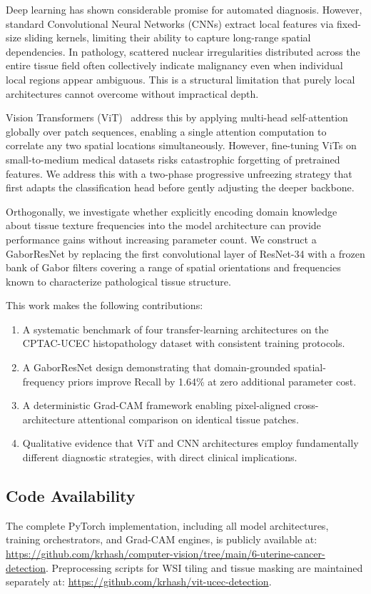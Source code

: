\documentclass[conference]{IEEEtran}
\begin{document}
Deep learning has shown considerable promise for automated diagnosis. However, standard Convolutional Neural Networks (CNNs) extract local features via fixed-size sliding kernels, limiting their ability to capture long-range spatial dependencies. In pathology, scattered nuclear irregularities distributed across the entire tissue field often collectively indicate malignancy even when individual local regions appear ambiguous. This is a structural limitation that purely local architectures cannot overcome without impractical depth.

Vision Transformers (ViT)~\cite{b6} address this by applying multi-head self-attention globally over patch sequences, enabling a single attention computation to correlate any two spatial locations simultaneously. However, fine-tuning ViTs on small-to-medium medical datasets risks catastrophic forgetting of pretrained features. We address this with a two-phase progressive unfreezing strategy that first adapts the classification head before gently adjusting the deeper backbone.

Orthogonally, we investigate whether explicitly encoding domain knowledge about tissue texture frequencies into the model architecture can provide performance gains without increasing parameter count. We construct a GaborResNet by replacing the first convolutional layer of ResNet-34 with a frozen bank of Gabor filters covering a range of spatial orientations and frequencies known to characterize pathological tissue structure.

This work makes the following contributions:
\begin{enumerate}
    \item A systematic benchmark of four transfer-learning architectures on the CPTAC-UCEC histopathology dataset with consistent training protocols.
    \item A GaborResNet design demonstrating that domain-grounded spatial-frequency priors improve Recall by 1.64\% at zero additional parameter cost.
    \item A deterministic Grad-CAM framework enabling pixel-aligned cross-architecture attentional comparison on identical tissue patches.
    \item Qualitative evidence that ViT and CNN architectures employ fundamentally different diagnostic strategies, with direct clinical implications.
\end{enumerate}

\subsection{Code Availability}
The complete PyTorch implementation, including all model architectures, training orchestrators, and Grad-CAM engines, is publicly available at: \url{https://github.com/krhash/computer-vision/tree/main/6-uterine-cancer-detection}. Preprocessing scripts for WSI tiling and tissue masking are maintained separately at: \url{https://github.com/krhash/vit-ucec-detection}.
\end{document}

